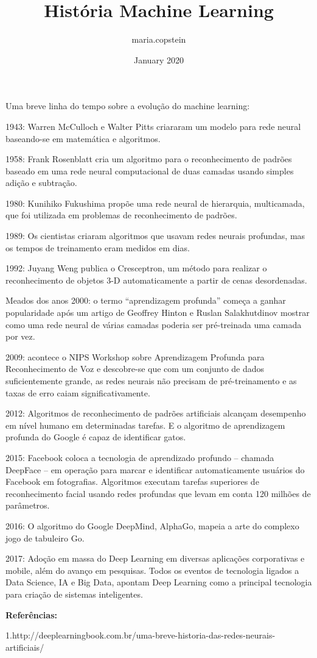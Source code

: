 \documentclass{article}
\title{História Machine Learning}
\author{maria.copstein }
\date{January 2020}
\begin{document}
\maketitle
Uma breve linha do tempo sobre a evolução do machine learning:

1943: Warren McCulloch e Walter Pitts criararam um modelo para rede neural baseando-se em matemática e algoritmos.

1958: Frank Rosenblatt cria um algoritmo para o reconhecimento de padrões baseado em uma rede neural computacional de duas camadas usando simples adição e subtração. 

1980: Kunihiko Fukushima propõe  uma rede neural de hierarquia, multicamada, que foi utilizada em problemas de reconhecimento de padrões.

1989: Os cientistas criaram algoritmos que usavam redes neurais profundas, mas os tempos de treinamento eram medidos em dias.

1992: Juyang Weng publica o Cresceptron, um método para realizar o reconhecimento de objetos 3-D automaticamente a partir de cenas desordenadas.

Meados dos anos 2000: o termo “aprendizagem profunda” começa a ganhar popularidade após um artigo de Geoffrey Hinton e Ruslan Salakhutdinov mostrar como uma rede neural de várias camadas poderia ser pré-treinada uma camada por vez.

2009: acontece o NIPS Workshop sobre Aprendizagem Profunda para Reconhecimento de Voz e descobre-se que com um conjunto de dados suficientemente grande, as redes neurais não precisam de pré-treinamento e as taxas de erro caiam significativamente.

2012: Algoritmos de reconhecimento de padrões artificiais alcançam desempenho em nível humano em determinadas tarefas. E o algoritmo de aprendizagem profunda do Google é capaz de identificar gatos.

2015: Facebook coloca a tecnologia de aprendizado profundo – chamada DeepFace – em operação para marcar e identificar automaticamente usuários do Facebook em fotografias. Algoritmos executam tarefas superiores de reconhecimento facial usando redes profundas que levam em conta 120 milhões de parâmetros.

2016: O algoritmo do Google DeepMind, AlphaGo, mapeia a arte do complexo jogo de tabuleiro Go.

2017: Adoção em massa do Deep Learning em diversas aplicações corporativas e mobile, além do avanço em pesquisas. Todos os eventos de tecnologia ligados a Data Science, IA e Big Data, apontam Deep Learning como a principal tecnologia para criação de sistemas inteligentes.

\hfill

\textbf{Referências:} \

\hfill

1.http://deeplearningbook.com.br/uma-breve-historia-das-redes-neurais-artificiais/
\end{document}
